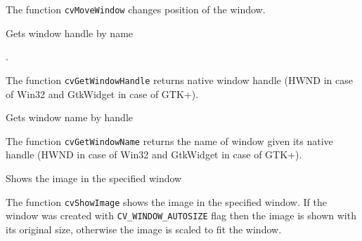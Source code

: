 
\begin{description}
\end{description}

The function \texttt{cvMoveWindow} changes position of the window.


Gets window handle by name


\begin{description}
.
\end{description}

The function \texttt{cvGetWindowHandle} returns native window handle (HWND in case of Win32 and GtkWidget in case of GTK+).


Gets window name by handle


\begin{description}
\end{description}

The function \texttt{cvGetWindowName} returns the name of window given its native handle (HWND in case of Win32 and GtkWidget in case of GTK+).


Shows the image in the specified window


\begin{description}
\end{description}

The function \texttt{cvShowImage} shows the image in the specified window. If the window was created with \texttt{CV\_WINDOW\_AUTOSIZE} flag then the image is shown with its original size, otherwise the image is scaled to fit the window.

